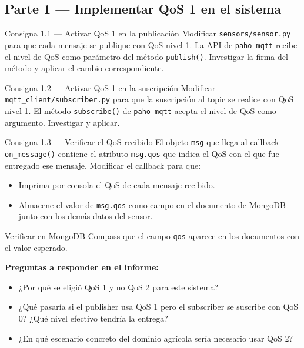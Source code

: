 \documentclass[12pt,a4paper]{article}
\begin{document}
\subsection{Parte 1 — Implementar QoS 1 en el sistema}

\begin{consigna}{Consigna 1.1 — Activar QoS 1 en la publicación}
Modificar \texttt{sensors/sensor.py} para que cada mensaje se publique con
QoS nivel 1. La API de \texttt{paho-mqtt} recibe el nivel de QoS como parámetro
del método \texttt{publish()}. Investigar la firma del método y aplicar el
cambio correspondiente.
\end{consigna}

\begin{consigna}{Consigna 1.2 — Activar QoS 1 en la suscripción}
Modificar \texttt{mqtt\_client/subscriber.py} para que la suscripción al
topic se realice con QoS nivel 1. El método \texttt{subscribe()} de
\texttt{paho-mqtt} acepta el nivel de QoS como argumento. Investigar y aplicar.
\end{consigna}

\begin{consigna}{Consigna 1.3 — Verificar el QoS recibido}
El objeto \texttt{msg} que llega al callback \texttt{on\_message()} contiene
el atributo \texttt{msg.qos} que indica el QoS con el que fue entregado ese
mensaje. Modificar el callback para que:
\begin{itemize}
  \item Imprima por consola el QoS de cada mensaje recibido.
  \item Almacene el valor de \texttt{msg.qos} como campo en el documento
        de MongoDB junto con los demás datos del sensor.
\end{itemize}
Verificar en MongoDB Compass que el campo \texttt{qos} aparece en los
documentos con el valor esperado.
\end{consigna}

\textbf{Preguntas a responder en el informe:}
\begin{itemize}
  \item ¿Por qué se eligió QoS 1 y no QoS 2 para este sistema?
  \item ¿Qué pasaría si el publisher usa QoS 1 pero el subscriber
        se suscribe con QoS 0? ¿Qué nivel efectivo tendría la entrega?
  \item ¿En qué escenario concreto del dominio agrícola sería necesario
        usar QoS 2?
\end{itemize}
\end{document}
